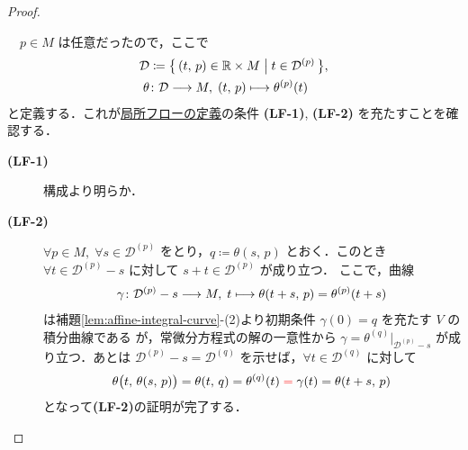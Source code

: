 \documentclass[geometry_main]{subfiles}
\begin{document}
\begin{proof}
\begin{description}
        　$p \in M$ は任意だったので，ここで
        \begin{align}
            \mathcal{D} &\coloneqq \bigl\{\, (t,\, p) \in \mathbb{R} \times M \bigm| t \in \mathcal{D}^{(p)} \,\bigr\}, \\
            \theta &\colon \mathcal{D} \longrightarrow M,\; (t,\, p) \longmapsto \theta^{(p)}(t)
        \end{align}
        と定義する．これが\hyperref[def:local-flow]{局所フローの定義}の条件 \textbf{\textsf{(LF-1)}},  \textbf{\textsf{(LF-2)}} を充たすことを確認する．
        \begin{description}
            \item[\textbf{(LF-1)}] 構成より明らか．
            \item[\textbf{(LF-2)}] $\forall p \in M,\; \forall s \in \mathcal{D}^{(p)}$ をとり，$q \coloneqq \theta(s,\, p)$ とおく．このとき $\forall t \in \mathcal{D}^{(p)} - s$ に対して $s+t \in \mathcal{D}^{(p)}$ が成り立つ．
            ここで，\cinfty 曲線
            \begin{align}
                \gamma \colon \mathcal{D}^{(p)} - s \longrightarrow M,\; t \longmapsto \theta(t+s,\, p) = \theta^{(p)}(t+s)
            \end{align}
            は補題\ref{lem:affine-integral-curve}-(2)より初期条件 $\gamma(0) = q$ を充たす $V$ の積分曲線である
            が，常微分方程式の解の一意性から $\gamma = \theta^{(q)}|_{\mathcal{D}^{(p)} - s}$ が成り立つ．あとは $\mathcal{D}^{(p)} - s = \mathcal{D}^{(q)}$ を示せば，$\forall t \in \mathcal{D}^{(q)}$ に対して
            \begin{align}
                \theta \bigl( t,\,\theta(s,\, p) \bigr) = \theta (t,\, q) = \theta^{(q)}(t) \;\textcolor{red}{=}\; \gamma(t) = \theta(t+s,\, p)
            \end{align}
            となって\textbf{\textsf{(LF-2)}}の証明が完了する．


\end{description}
\end{description}
\end{proof}
\end{document}
